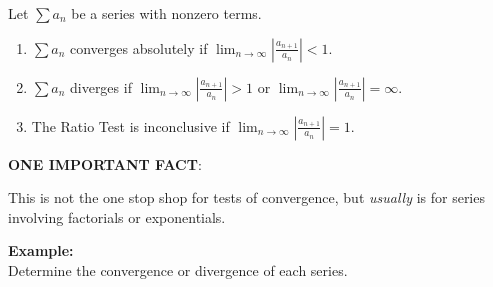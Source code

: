 \documentclass[addpoints, 12pt]{exam}
\begin{document}
\begin{tcolorbox}[title= THE RATIO TEST,sharp corners,colback=white,colbacktitle=white,coltitle=black]

    Let     $\displaystyle\sum a_n$ be a series with nonzero terms.
    \begin{enumerate}
        \item $\displaystyle\sum a_n$ converges absolutely if $\displaystyle\lim_{n\to\infty}\left|\frac{a_{n+1}}{a_n}\right|<1$.
        \item $\displaystyle\sum a_n$ diverges if $\displaystyle\lim_{n\to\infty}\left|\frac{a_{n+1}}{a_n}\right|>1$ or $\displaystyle\lim_{n\to\infty}\left|\frac{a_{n+1}}{a_n}\right|=\infty$.
        \item The Ratio Test is inconclusive if $\displaystyle\lim_{n\to\infty}\left|\frac{a_{n+1}}{a_n}\right|=1$.
    \end{enumerate}

\end{tcolorbox}
\vspace{.1in}
\noindent\textbf{ONE IMPORTANT FACT}:
\begin{questions}
    \question This is not the one stop shop for tests of convergence, but \textit{usually} is for series involving factorials or exponentials.
\end{questions}
\vspace{.1in}

\noindent\textbf{Example:}\\
Determine the convergence or divergence of each series.
\end{document}

